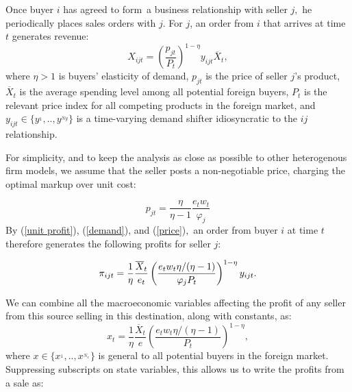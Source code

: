 Once buyer $i$ has agreed to form\ a business relationship with seller $j,$
he periodically places sales orders with $j$. For $j$, an order from $i$
that arrives at time $t$ generates revenue:%
\begin{equation}
X_{ijt}=\left( \frac{p_{jt}}{P_{t}}\right) ^{1-\eta }y_{ijt}\overline{X}_{t},
\label{demand}
\end{equation}%
where $\eta >1$ is buyers' elasticity of demand, $p_{jt}$ is the price of
seller $j$'s product, $\overline{X}_{t}$ is the average spending level among
all potential foreign buyers, $P_{t}$ is the relevant price index for all
competing products in the foreign market, and $y_{ijt}\in
\{y^{_{1}},..,y^{_{Ny}}\}$ is a time-varying demand shifter idiosyncratic to
the $ij$ relationship.\footnotemark{}

For simplicity, and to keep the analysis as close as possible to other
heterogenous firm models, we assume that the seller posts a non-negotiable
price, charging the optimal markup over unit cost:\footnotemark{}

\begin{equation}
p_{jt}=\frac{\eta }{\eta -1}\frac{e_{t}w_{t}}{\varphi _{j}}  \label{price}
\end{equation}%
By (\ref{unit profit}), (\ref{demand}), and (\ref{price}),\ an order from
buyer $i$ at time $t$ therefore generates the following profits for seller $%
j $:

\begin{equation*}
\pi _{ijt}=\frac{1}{\eta }\frac{\overline{X}_{t}}{e_{t}}\left( \frac{%
e_{t}w_{t}\eta /(\eta -1)}{\varphi _{j}P_{t}}\right) ^{1-\eta }y_{ijt}.
\end{equation*}

We can combine all the macroeconomic variables affecting the profit of any
seller from this source selling in this destination, along with constants,
as:%
\begin{equation*}
x_{t}=\frac{1}{\eta }\frac{\overline{X}_{t}}{e}\left( \frac{e_{t}w_{t}\eta
/(\eta -1)}{P_{t}}\right) ^{1-\eta },
\end{equation*}%
where $x\in \{x^{_{1}},..,x^{_{N_{x}}}\}$ is general to all potential buyers
in the foreign market. Suppressing subscripts on state variables, this
allows us to write the profits from a sale as:

